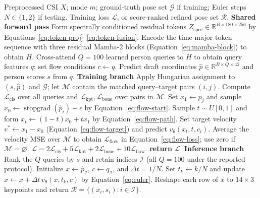 \documentclass[conference,onecolumn]{IEEEtran}
\begin{document}
\begin{algorithm}[!t]
\caption{Conditional draft-to-refine pose estimation}
\label{alg:draft-to-refine}
\begin{algorithmic}[1]
\REQUIRE Preprocessed CSI $X$; mode $m$; ground-truth pose set $\mathcal G$ if training; Euler steps $N\in\{1,2\}$ if testing.
\ENSURE Training loss $\mathcal L$, or score-ranked refined pose set $\mathcal R$.
\STATE \textbf{Shared forward pass}
\STATE Form spectrally conditioned residual tokens $Z_{\mathrm{spec}}\in\mathbb R^{B\times180\times256}$ by Equations~\ref{eq:token-proj}--\ref{eq:token-fusion}.
\STATE Encode the time-major token sequence with three residual Mamba-2 blocks (Equation~\ref{eq:mamba-block}) to obtain $H$.
\STATE Cross-attend $Q{=}100$ learned person queries to $H$ to obtain query features $q$; set flow conditions $c\leftarrow q$.
\STATE Predict draft coordinates $\hat p\in\mathbb R^{B\times Q\times42}$ and person scores $s$ from $q$.
    \STATE \textbf{Training branch}
    \STATE Apply Hungarian assignment to $(s,\hat p)$ and $\mathcal G$; let $\mathcal M$ contain the matched query--target pairs $(i,j)$.
    \STATE Compute $\mathcal L_{\mathrm{cls}}$ over all queries and $\mathcal L_{\mathrm{kpt}},\mathcal L_{\mathrm{bone}}$ over pairs in $\mathcal M$.
        \STATE Set $x_1\leftarrow p_j$ and sample $x_0\leftarrow\operatorname{stopgrad}(\hat p_i)+\epsilon$ by Equation~\ref{eq:flow-start}.
        \STATE Sample $t\sim U[0,1]$ and form $x_t\leftarrow(1-t)x_0+t x_1$ by Equation~\ref{eq:flow-path}.
        \STATE Set target velocity $v^*\leftarrow x_1-x_0$ (Equation~\ref{eq:flow-target}) and predict $v_\theta(x_t,t,c_i)$.
    \ENDFOR
    \STATE Average the velocity MSE over $\mathcal M$ to obtain $\mathcal{L}_{\mathrm{flow}}$ in Equation~\ref{eq:flow-loss}; use zero if $\mathcal M=\varnothing$.
    \STATE $\mathcal{L}=2\mathcal{L}_{\mathrm{cls}}+5\mathcal{L}_{\mathrm{kpt}}+2\mathcal{L}_{\mathrm{bone}}+10\mathcal{L}_{\mathrm{flow}}$.
    \STATE \textbf{return} $\mathcal L$.
\ELSE
    \STATE \textbf{Inference branch}
    \STATE Rank the $Q$ queries by $s$ and retain indices $\mathcal I$ (all $Q{=}100$ under the reported protocol).
    \STATE Initialize $x\leftarrow\hat p_{\mathcal I}$, $c\leftarrow q_{\mathcal I}$, and $\Delta t=1/N$.
        \STATE Set $t_k\leftarrow k/N$ and update $x\leftarrow x+\Delta t\,v_\theta(x,t_k,c)$ by Equation~\ref{eq:euler}.
    \ENDFOR
    \STATE Reshape each row of $x$ to $14\times3$ keypoints and return $\mathcal R=\{(x_i,s_i):i\in\mathcal I\}$.
\ENDIF
\end{algorithmic}
\end{algorithm}
\end{document}
